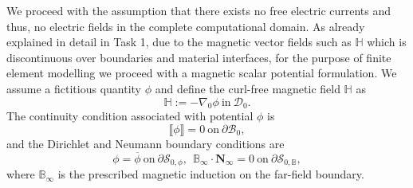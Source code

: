 \documentclass[11pt,a4paper,final]{article}
\begin{document}
We proceed with the assumption that there exists no free electric currents and thus, no electric fields in the complete computational domain. As already explained in detail in Task 1, due to the magnetic vector fields such as $\mathbb{H}$ which is discontinuous over boundaries and material interfaces, for the purpose of finite element modelling we proceed with a magnetic scalar potential formulation. We assume a fictitious quantity $\phi$ and define the curl-free magnetic field $\mathbb{H}$ as \cite{ogden2011mechanics,Dorfmann2014} 
\begin{equation}
\mathbb{H} := -\nabla_0 \phi \ \text{in} \ \mathcal{D}_0.
\label{eq:3.0}
\end{equation}
The continuity condition associated with potential $\phi$ is 
\begin{equation}
\llbracket \phi \rrbracket = 0 \ \text{on} \ \partial\mathcal{B}_{0},
\label{eq:3.0.1}
\end{equation}
and the Dirichlet and Neumann boundary conditions are
\begin{equation}
\phi = \overline{\phi} \ \text{on} \ \partial \mathcal{S}_{0,\phi}, \ \ \mathbb{B}_{\infty} \cdot \mathbf{N}_{\infty} = 0 \ \text{on} \ \partial\mathcal{S}_{0,\mathbb{B}},
\label{eq:3.0.2}
\end{equation}
where $\mathbb{B}_{\infty}$ is the prescribed magnetic induction on the far-field boundary.
\end{document}
